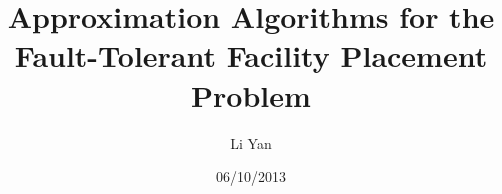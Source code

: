 \documentclass[hyperref,dvipsnames,svgnames,compress]{beamer}
\title[Approximation Algorithms for FTFP]{Approximation Algorithms
  for the Fault-Tolerant Facility Placement Problem}
\author[lyan@cs.ucr.edu]{Li Yan}
\institute[UCR]{
  Computer Science\\
  University of California Riverside\\
}
\date{06/10/2013}
\begin{document}
\begin{frame}
  \titlepage
\end{frame}

\begin{frame}
  \tableofcontents[hideallsubsections]
\end{frame}


\end{document}
